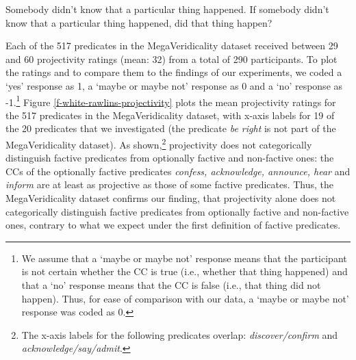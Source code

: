 \documentclass[11pt,fleqn]{article}
\newcommand{\6}{\mbox{$[\hspace*{-.6mm}[$}}
\newcommand{\9}{\mbox{$]\hspace*{-.6mm}]$}}
\begin{document}
\begin{exe}
\ex\label{wr-stim-proj}
\begin{xlist}
\ex Somebody didn't know that a particular thing happened.
\ex If somebody didn't know that a particular thing happened, did that thing happen?
\end{xlist}
\end{exe}

Each of the 517 predicates in the MegaVeridicality dataset received between 29 and 60 projectivity ratings (mean: 32) from a total of 290 participants. To plot the ratings and to compare them to the findings of our experiments, we coded a `yes' response as 1,  a `maybe or maybe not' response as 0 and a `no' response as -1.\footnote{We assume that a `maybe or maybe not' response means that the participant is not certain whether the CC is true (i.e., whether that thing happened) and that a `no' response means that the CC is false (i.e., that thing did not happen). Thus, for ease of comparison with our data, a `maybe or maybe not' response was coded as 0.} Figure \ref{f-white-rawlins-projectivity} plots the mean projectivity ratings for the 517 predicates in the MegaVeridicality dataset, with x-axis labels for 19 of the 20 predicates that we investigated (the predicate {\em be right} is not part of the MegaVeridicality dataset). As shown,\footnote{The x-axis labels for the following predicates overlap: {\em discover/confirm} and {\em acknowledge/say/admit}.} projectivity does not categorically distinguish factive predicates from optionally factive and non-factive ones: the CCs of the optionally factive predicates {\em confess, acknowledge, announce, hear} and {\em inform} are at least as projective as those of some factive predicates. Thus, the MegaVeridicality dataset confirms our finding, that projectivity alone does not categorically distinguish factive predicates from optionally factive and non-factive ones, contrary to what we expect under the first definition of factive predicates.
\end{document}

